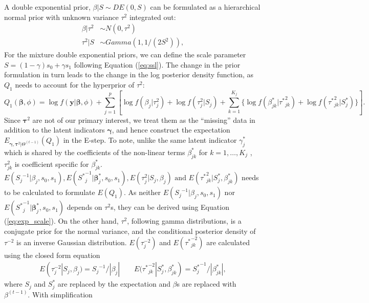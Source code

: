 \documentclass[AMA,STIX1COL,]{WileyNJD-v2}
\begin{document}
A double exponential prior, \(\beta|S \sim DE(0, S)\) can be formulated
as a hierarchical normal prior with unknown variance \(\tau^2\)
integrated out: \begin{align*}
  \beta|\tau^2 &\sim N(0, \tau^2)\\
  \tau^2|S & \sim Gamma(1, 1/(2S^2)), 
\end{align*} For the mixture double exponential priors, we can define
the scale parameter \(S = (1-\gamma)s_0 + \gamma s_1\) following
Equation (\ref{eq:ssl}). The change in the prior formulation in turn
leads to the change in the log posterior density function, as \(Q_1\)
needs to account for the hyperprior of \(\tau^2\):
\begin{equation}\label{eq:Q1_IWLS}
Q_1(\boldsymbol{\beta}, \phi) = \log f(\textbf{y}|\boldsymbol{\beta}, \phi) + \sum\limits_{j=1}^p\left[\log f(\beta_j|{\tau}^2_j) + \log f({\tau}^2_j| S_j)+\sum\limits_{k=1}^{K_j} \{\log f(\beta^{*}_{jk}|{\tau^{*}}^2_{jk})+\log f({\tau^*}^2_{jk}| S^*_j)\}\right].
\end{equation} Since \(\boldsymbol{\tau}^2\) are not of our primary
interest, we treat them as the ``missing'' data in addition to the
latent indicators \(\boldsymbol{\gamma}\), and hence construct the
expectation
\(E_{\boldsymbol{\gamma}, \boldsymbol{\tau}^2|\Theta^{(t-1)}}(Q_1)\) in
the E-step. To note, unlike the same latent indicator \(\gamma^*_j\)
which is shared by the coefficients of the non-linear terms
\(\beta^*_{jk}\) for \(k = 1, \dots, K_j\) , \(\tau^2_{jk}\) is
coefficient specific for \(\beta^*_{jk}\).
\(E({S_j}^{-1}|\beta_j, s_0, s_1), E({S^*}^{-1}_j|\boldsymbol{\beta}_j^*, s_0, s_1), E({\tau}^2_{j}|S_j, \beta_j) \text{ and } E({\tau^*}^2_{jk}|S_j^*, \beta^*_{jk})\)
needs to be calculated to formulate \(E(Q_1)\). As neither
\(E({S_j}^{-1}|\beta_j, s_0, s_1)\) nor
\(E({S^*}^{-1}_j|\boldsymbol{\beta}_j^*, s_0, s_1)\) depends on
\(\tau^2\)s, they can be derived using Equation (\ref{eq:exp_scale}). On
the other hand, \(\tau^{2}\), following gamma distributions, is a
conjugate prior for the normal variance, and the conditional posterior
density of \(\tau^{-2}\) is an inverse Gaussian distribution.
\(E({\tau}^{-2}_{j})\) and \(E({\tau^*}^{-2}_{jk})\) are calculated
using the closed form equation \begin{align*}
 E({\tau}^{-2}_{j}|S_j, \beta_j) ={S_j}^{-1}/|\beta_j| \qquad E({\tau^*}^{-2}_{jk}|S_j^*, \beta^*_{jk})={S_j^*}^{-1}/|\beta^*_{jk}|,
\end{align*} where \(S_j\) and \(S_j^*\) are replaced by the expectation
and \(\beta\)s are replaced with \(\beta^{(t-1)}\). With simplification
\end{document}
